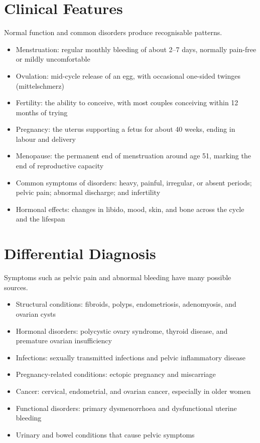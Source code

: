 \section*{Clinical Features}
Normal function and common disorders produce recognisable patterns.
\begin{itemize}
    \item Menstruation: regular monthly bleeding of about 2--7 days, normally pain-free or mildly uncomfortable
    \item Ovulation: mid-cycle release of an egg, with occasional one-sided twinges (mittelschmerz)
    \item Fertility: the ability to conceive, with most couples conceiving within 12 months of trying
    \item Pregnancy: the uterus supporting a fetus for about 40 weeks, ending in labour and delivery
    \item Menopause: the permanent end of menstruation around age 51, marking the end of reproductive capacity
    \item Common symptoms of disorders: heavy, painful, irregular, or absent periods; pelvic pain; abnormal discharge; and infertility
    \item Hormonal effects: changes in libido, mood, skin, and bone across the cycle and the lifespan
\end{itemize}

\section*{Differential Diagnosis}
Symptoms such as pelvic pain and abnormal bleeding have many possible sources.
\begin{itemize}
    \item Structural conditions: fibroids, polyps, endometriosis, adenomyosis, and ovarian cysts
    \item Hormonal disorders: polycystic ovary syndrome, thyroid disease, and premature ovarian insufficiency
    \item Infections: sexually transmitted infections and pelvic inflammatory disease
    \item Pregnancy-related conditions: ectopic pregnancy and miscarriage
    \item Cancer: cervical, endometrial, and ovarian cancer, especially in older women
    \item Functional disorders: primary dysmenorrhoea and dysfunctional uterine bleeding
    \item Urinary and bowel conditions that cause pelvic symptoms
\end{itemize}

